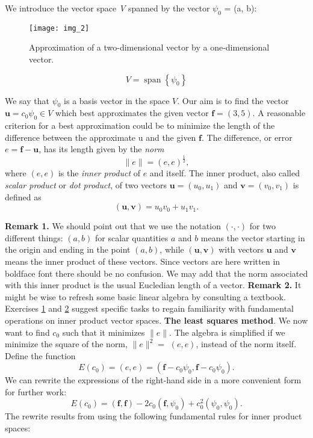 \documentclass[../main.tex]{subfiles}
\begin{document}
We introduce the vector space \textit{V} spanned by the vector $\psi_{0}$ = (a, b):

\begin{figure}[H]
	\centering
	\texttt{[image: img\_2]}
	\caption{Approximation of a two-dimensional vector by a one-dimensional vector.}
	\label{fig:img_2}
\end{figure}
\begin{equation}\label{eqa2}
	V=\operatorname{span}\left\{\psi_{0}\right\}
\end{equation}

\noindent We say that $\psi_{0}$ is a basis vector in the space $V$. Our aim is to find the vector $\boldsymbol{u}=c_{0} \psi_{0} \in V$ which best approximates the given vector $\boldsymbol{f}=(3,5)$. A reasonable criterion for a best approximation could be to minimize the length of the difference between the approximate u and the given $\boldsymbol{f}$. The difference, or error $e=\boldsymbol{f}-\boldsymbol{u}$, has its length given by the \textit{norm}
$$
	\|e\|=(e, e)^{\frac{1}{2}},
$$
where $(e, e)$ is the \textit{inner product} of $e$ and itself. The inner product, also called \textit{scalar product} or \textit{dot product}, of two vectors $\boldsymbol{u}=\left(u_{0}, u_{1}\right)$ and $\boldsymbol{v}=\left(v_{0}, v_{1}\right)$ is defined as
\begin{equation}\label{eqa3}
	(\boldsymbol{u}, \boldsymbol{v})=u_{0} v_{0}+u_{1} v_{1}.
\end{equation}

\noindent \textbf{Remark 1.} We should point out that we use the notation $(\cdot, \cdot)$ for two different things: $(a, b)$ for scalar quantities $a$ and $b$ means the vector starting in the origin and ending in the point $(a, b)$, while $(\boldsymbol{u}, \boldsymbol{v})$ with vectors $\boldsymbol{u}$ and $\boldsymbol{v}$ means the inner product of these vectors. Since vectors are here written in boldface font there should be no confusion. We may add that the norm associated with this inner product is the usual Eucledian length of a vector.
\bigbreak
\noindent \textbf{Remark 2.} It might be wise to refresh some basic linear algebra by consulting a textbook. Exercises \hyperref[sec:sec_10_1]{1} and \hyperref[sec:sec_10_1]{2} suggest specific tasks to regain familiarity with fundamental operations on inner product vector spaces.
\bigbreak
\noindent \textbf{The least squares method}. We now want to find $c_{0}$ such that it minimizes $\|e\|$. The algebra is simplified if we minimize the square of the norm, $\|e\|^{2}=$ $(e, e)$, instead of the norm itself. Define the function
\begin{equation}\label{eqa4}
	E\left(c_{0}\right)=(e, e)=\left(\boldsymbol{f}-c_{0} \psi_{0}, \boldsymbol{f}-c_{0} \psi_{0}\right).
\end{equation}
We can rewrite the expressions of the right-hand side in a more convenient form for further work:
\begin{equation}\label{eqa5}
	E\left(c_{0}\right)=(\boldsymbol{f}, \boldsymbol{f})-2 c_{0}\left(\boldsymbol{f}, \psi_{0}\right)+c_{0}^{2}\left(\psi_{0}, \psi_{0}\right).
\end{equation}
The rewrite results from using the following fundamental rules for inner product spaces:
\end{document}
